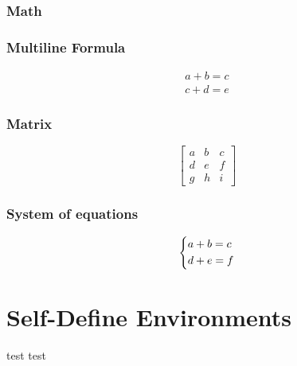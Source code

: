 \subsubsection{Math}

\subsubsection{Multiline Formula}
\begin{gather*}
	a + b = c \\
	c + d = e
\end{gather*}

\subsubsection{Matrix}
\[
	\begin{bmatrix}
		a & b & c \\
		d & e & f \\
		g & h & i
	\end{bmatrix}
\]

\subsubsection{System of equations}
\[
	\begin{dcases}
		a + b = c \\
		d + e = f
	\end{dcases}
\]

\section{Self-Define Environments}

\begin{Definition}{test}{}
	test
\end{Definition}

